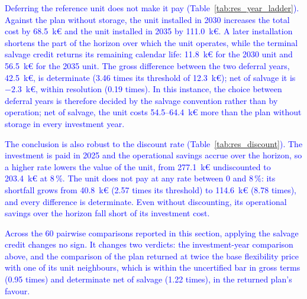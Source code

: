 \textcolor{blue}{
    Deferring the reference unit does not make it pay (Table~\ref{tab:res_year_ladder}). Against the plan without storage, the unit installed in 2030 increases the total cost by 68.5~k\euro{} and the unit installed in 2035 by 111.0~k\euro{}. A later installation shortens the part of the horizon over which the unit operates, while the terminal salvage credit returns its remaining calendar life: 11.8~k\euro{} for the 2030 unit and 56.5~k\euro{} for the 2035 unit. The gross difference between the two deferral years, 42.5~k\euro{}, is determinate (3.46 times its threshold of 12.3~k\euro{}); net of salvage it is $-2.3$~k\euro{}, within resolution (0.19 times). In this instance, the choice between deferral years is therefore decided by the salvage convention rather than by operation; net of salvage, the unit costs 54.5--64.4~k\euro{} more than the plan without storage in every investment year.
}

\textcolor{blue}{
    The conclusion is also robust to the discount rate (Table~\ref{tab:res_discount}). The investment is paid in 2025 and the operational savings accrue over the horizon, so a higher rate lowers the value of the unit, from 277.1~k\euro{} undiscounted to 203.4~k\euro{} at 8\,\%. The unit does not pay at any rate between 0 and 8\,\%: its shortfall grows from 40.8~k\euro{} (2.57 times its threshold) to 114.6~k\euro{} (8.78 times), and every difference is determinate. Even without discounting, its operational savings over the horizon fall short of its investment cost.
}

\textcolor{blue}{
    Across the 60 pairwise comparisons reported in this section, applying the salvage credit changes no sign. It changes two verdicts: the investment-year comparison above, and the comparison of the plan returned at twice the base flexibility price with one of its unit neighbours, which is within the uncertified bar in gross terms (0.95 times) and determinate net of salvage (1.22 times), in the returned plan's favour.
}

